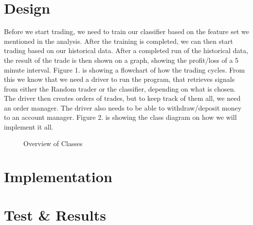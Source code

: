 \documentclass[10pt]{IEEEtran}
\begin{document}
\section{Design}
Before we start trading, we need to train our classifier based on the feature set we mentioned in the analysis. After the training is completed, we can then start trading based on our historical data. 
After a completed run of the historical data, the result of the trade is then shown on a graph, showing the profit/loss of a 5 minute interval. Figure 1. is showing a flowchart of how the trading cycles. From this we know that we need a driver to run the program, that retrieves signals from either the Random trader or the classifier, depending on what is chosen. The driver then creates orders of trades, but to keep track of them all, we need an order manager. The driver also needs to be able to withdraw/deposit money to an account manager. Figure 2. is showing the class diagram on how we will implement it all.\\

\begin{figure}
\begin{center}
\end{center}
\caption{Overview of Classes}
\end{figure}

\section{Implementation}


\section{Test \& Results}
\end{document}
